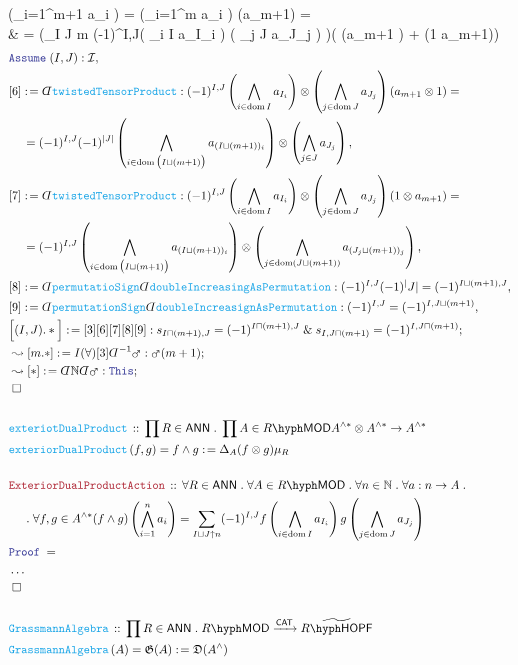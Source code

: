 \documentclass[12pt]{scrartcl}%
\newcommand{\FUNC}[1]{\textcolor{Cerulean}{\mathtt{#1}}}%
\newcommand{\LOGIC}[1]{\textcolor{Blue}{\mathtt{#1}}}%
\newcommand{\THM}[1]{\textcolor{Maroon}{\mathtt{#1}}}%
\renewcommand{\.}{\; . \;} %
\newcommand{\de}{: \kern 0.1pc =} %
\newcommand{\Act}[1]{\left( #1 \right)} %
\newcommand{\Theorem}[2]{& \THM{#1} \, :: \, #2 \\ & \Proof = \\ } %
\newcommand{\DeclareFunc}[2]{& \FUNC{#1} \, :: \, #2 \\}%
\newcommand{\DefineNamedFunc}[4]{&  \FUNC{#1}\Act{#2} = #3 \de #4 \\}%
\newcommand{\NewLine}{\\ & \kern 1pc}%
\newcommand{\Page}[1]{ \begin{align*} #1 \end{align*}  }%
\newcommand{ \bd }{ \ByDef }%
\newcommand{\NoProof}{ & \ldots \\ \EndProof}%
\renewcommand{\And}{\; \& \;}%
\newcommand{\Nat}{\mathbb{N}}%
\newcommand{\Say}[3]{& #1 \de #2 : #3, \\} %
\newcommand{\Conclude}[3]{& #1 \de #2 : #3; \\}%
\newcommand{\DeriveConclude}[3]{& \leadsto #1 \de #2 : #3 ; \\} %
\newcommand{\Assume}[2]{& \LOGIC{Assume} \; #1 : #2, \\} %
\newcommand{\QED}{\; \square} %
\newcommand{\EndProof}{& \QED \\} %
\newcommand{\ByDef}{\rotatebox[origin=c]{-180}{$D$}}%
\newcommand{\Proof}{\LOGIC{Proof} \; } %
\newcommand{\Arrow}[1]{\xrightarrow{#1}}%
\DeclareMathOperator*{\dom}{dom} %
\newcommand{\I}{\mathcal{I}}
\newcommand{\CAT}{\mathsf{CAT}} %
\newcommand{\LMOD}[1]{#1\hyph\mathsf{MOD}} %
\newcommand{\ANN}{\mathsf{ANN}} %
\newcommand{\HOPF}[1]{#1\hyph\mathsf{HOPF}}
\begin{document}
{{		\Delta\left(\bigwedge_{i=1}^{m+1} a_i \right)  =
		\Delta\left(\bigwedge_{i=1}^m a_i \right) \Delta(a_{m+1}) = \NewLine = 
		\left(\sum_{I \sqcup J \uparrow m}  (-1)^{I,J}\left( \bigwedge_{i \in \dom I} a_{I_i} \right) \otimes
		\left( \bigwedge_{j \in \dom J} a_{J_j} \right) \right)\Big( (a_{m+1} ) + (1 \otimes a_{m+1})\Big) 
	}
}\Page{
	\Assume{(I,J)}{\I}
	\Say{[6]}{ \bd \FUNC{twistedTensorProduct}  }
	{
	   (-1)^{I,J}\left( \bigwedge_{i \in \dom I} a_{I_i} \right) \otimes
		\left( \bigwedge_{j \in \dom J} a_{J_j} \right) 
		 (a_{m+1} \otimes 1) = \NewLine =
	   (-1)^{I,J}(-1)^{|J|}  \left( \bigwedge_{i \in \dom \big(I \sqcup (m+1)\big)} a_{(I\sqcup(m+1))_i} \right) 
	   \otimes \left( \bigwedge_{j \in J} a_{J_j} \right)
	}
	\Say{[7]}{ \bd \FUNC{twistedTensorProduct}  }
	{
	   (-1)^{I,J}\left( \bigwedge_{i \in \dom I} a_{I_i} \right) \otimes
		\left( \bigwedge_{j \in \dom J} a_{J_j} \right) 
		 (1 \otimes a_{m+1}) = \NewLine = 
	   (-1)^{I,J}  \left( \bigwedge_{i \in \dom \big(I \sqcup (m+1)\big)} a_{(I\sqcup(m+1))_i} \right) 
	   \otimes \left( \bigwedge_{j \in \dom(J\sqcup(m+1))} a_{(J_j\sqcup(m+1))_j} \right)
	}
	\Say{[8]}{\bd \FUNC{permutatioSign}\bd \FUNC{doubleIncreasingAsPermutation}}{
		(-1)^{I,J}(-1)^|J| = (-1)^{I\sqcup(m+1),J} 
	}
	\Say{[9]}{\bd \FUNC{permutationSign} \bd \FUNC{doubleIncreasignAsPermutation}}
	{
		(-1)^{I,J} = (-1)^{I,J\sqcup (m+1)}
	}
	\Conclude{\Big[(I,J).*\Big]}{[3][6][7][8][9]}
	{
		s_{I\sqcap(m+1),J} = (-1)^{I\sqcap(m+1),J} 
		\And
		s_{I,J\sqcap(m+1)} = (-1)^{I,J\sqcap(m+1)}
	}
	\DeriveConclude{[m.*]}{I(\forall)[3]\bd^{-1}\mars}
	{
		\mars(m+1)
	}
	\DeriveConclude{[*]}{\bd \Nat \bd \mars}{ \LOGIC{This}}
	\EndProof
	\\
	\DeclareFunc{exteriotDualProduct}
	{
		\prod R \in \ANN \. 
		\prod A \in \LMOD{R}
		A^{\wedge*}\otimes A^{\wedge*} \to A^{\wedge*}
	}
	\DefineNamedFunc{exteriorDualProduct}{f,g}{f \wedge g}{\Delta_A(f \otimes g)\mu_R}
	\\
	\Theorem{ExteriorDualProductAction}{
		\forall R \in \ANN \.
		\forall A \in \LMOD{R} \.
		\forall n \in \Nat \.
		\forall a : n \to A \. \NewLine \.
		\forall f,g \in A^{\wedge*}
		(f \wedge g)\left(\bigwedge^n_{i=1} a_i \right) =
		\sum_{I \sqcup J \uparrow n}  (-1)^{I,J}f\left( \bigwedge_{i \in \dom I} a_{I_i} \right) 
		g\left( \bigwedge_{j \in \dom J} a_{J_j} \right) 
	}
	\NoProof
	\\
	\DeclareFunc{GrassmannAlgebra}
	{
		\prod R \in \ANN \.
		\LMOD{R}  \Arrow{\CAT} \widetilde{\HOPF{R}} 
	}
	\DefineNamedFunc{GrassmannAlgebra}{A}{\mathfrak{G}(A)}{\mathfrak{D}(A^\wedge)}
}
\end{document}
